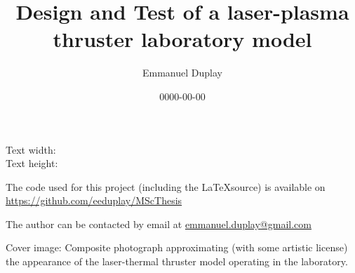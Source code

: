 \documentclass[11pt,a4paper]{report}
\title{Design and Test of a laser-plasma thruster laboratory model}
\author{Emmanuel Duplay}
\date{0000-00-00}
\begin{document}
    \setlength{\parindent}{0pt}
    \setlength{\headheight}{13.6pt}
    
    

    \newpage
    {   \sffamily
        \thispagestyle{empty}
        \vspace*{\fill}
        Text width: \the\textwidth  \\ %
        Text height: \the\textheight  %

        The code used for this project (including the \LaTeX\hspace{0.67ex}source) is available on \\ \url{https://github.com/eeduplay/MScThesis}

        The author can be contacted by email at \href{mailto:emmanuel.duplay@gmail.com}{emmanuel.duplay@gmail.com}

        Cover image: Composite photograph approximating (with some artistic license) the appearance of the laser-thermal thruster model operating in the laboratory.
    }

    
    \hypersetup{linkcolor=black}
    \tableofcontents
    
    \listoffigures
    
    \listoftables
    \hypersetup{linkcolor=cyan}
    
    

    \newpage
    

    \newpage

    
    
    
    
    
    
    
    \clearpage
    \printbibliography[
        heading=bibintoc,
        title={References},
        block=ragged,
        prenote=bibmark
        ]
    \newpage
\end{document}
